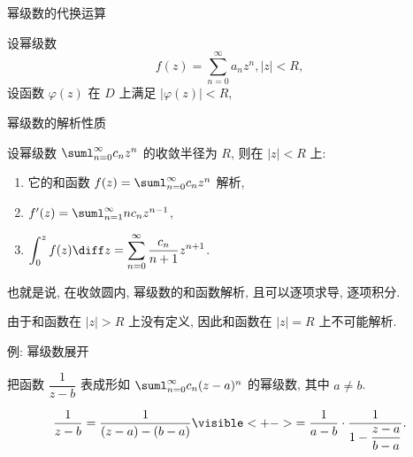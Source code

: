 \begin{frame}{幂级数的代换运算}
	\onslide<+->
	\begin{theorem}
		设幂级数
		\[f(z)=\sum_{n=0}^\infty a_nz^n,|z|<R,\]
		设函数 $\varphi(z)$ 在 $D$ 上满足 $|\varphi(z)|<R$, 
		\onslide<+->{%
		那么当 $z\in D$ 时,
		\[f\bigl(\varphi(z)\bigr)\sum_{n=0}^\infty a_n\bigl(\varphi(z)\bigr)^n.\]
		}
	\end{theorem}
\end{frame}


\begin{frame}{幂级数的解析性质}
	\onslide<+->
	\begin{theorem}
		设幂级数 $\suml_{n=0}^\infty c_nz^n$ 的收敛半径为 $R$, 则在 $|z|<R$ 上:
		\begin{enumerate}
			\item 它的和函数 $f(z)=\suml_{n=0}^\infty c_nz^n$ 解析,
			\item $f'(z)=\suml_{n=1}^\infty nc_nz^{n-1}$,
			\item $\displaystyle\int_0^zf(z)\diff z=\sum_{n=0}^\infty \frac{c_n}{n+1}z^{n+1}$.
		\end{enumerate}
	\end{theorem}

	\onslide<+->
	也就是说, \alert{在收敛圆内, 幂级数的和函数解析, 且可以逐项求导, 逐项积分}.

	\onslide<+->
	由于和函数在 $|z|>R$ 上没有定义, 因此和函数在 $|z|=R$ 上不可能解析.
\end{frame}


\begin{frame}{例: 幂级数展开}
	\onslide<+->
	\begin{example}
		把函数 $\dfrac1{z-b}$ 表成形如 $\suml_{n=0}^\infty c_n(z-a)^n$ 的幂级数, 其中 $a\neq b$.
	\end{example}

	\onslide<+->
	\begin{solution}
		\[\frac1{z-b}=\frac1{(z-a)-(b-a)}
		\visible<+->{=\frac1{a-b}\cdot\frac1{1-\dfrac{z-a}{b-a}}.}\]
		\onslide<+->{即
		\[\frac1{z-b}=-\sum_{n=0}^\infty\frac{(z-a)^n}{(b-a)^{n+1}},\quad|z-a|<|b-a|.\]}
		\vspace{-.5\baselineskip}
	\end{solution}
\end{frame}


